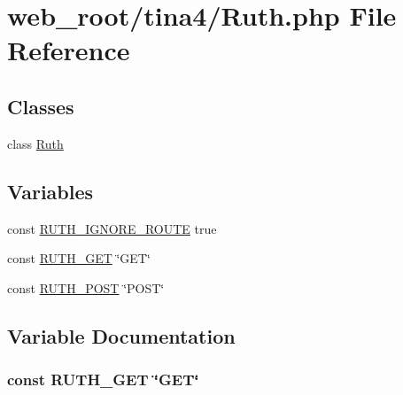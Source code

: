 \hypertarget{Ruth_8php}{}\section{web\+\_\+root/tina4/\+Ruth.php File Reference}
\label{Ruth_8php}
\subsection*{Classes}
\begin{DoxyCompactItemize}
\item 
class \hyperlink{classRuth}{Ruth}
\end{DoxyCompactItemize}
\subsection*{Variables}
\begin{DoxyCompactItemize}
\item 
const \hyperlink{Ruth_8php_a007827b20a122223418cd0bed933b32c}{R\+U\+T\+H\+\_\+\+I\+G\+N\+O\+R\+E\+\_\+\+R\+O\+U\+T\+E} true
\item 
const \hyperlink{Ruth_8php_acc73cd34b6fcffd15a4fdd050e0a86d8}{R\+U\+T\+H\+\_\+\+G\+E\+T} \char`\"{}G\+E\+T\char`\"{}
\item 
const \hyperlink{Ruth_8php_af749f90f066c3572c6dae5f01eb61af8}{R\+U\+T\+H\+\_\+\+P\+O\+S\+T} \char`\"{}P\+O\+S\+T\char`\"{}
\end{DoxyCompactItemize}


\subsection{Variable Documentation}
\hypertarget{Ruth_8php_acc73cd34b6fcffd15a4fdd050e0a86d8}{}
\subsubsection[{R\+U\+T\+H\+\_\+\+G\+E\+T}]{\setlength{\rightskip}{0pt plus 5cm}const R\+U\+T\+H\+\_\+\+G\+E\+T \char`\"{}G\+E\+T\char`\"{}}\label{Ruth_8php_acc73cd34b6fcffd15a4fdd050e0a86d8}
\hypertarget{Ruth_8php_a007827b20a122223418cd0bed933b32c}{}
